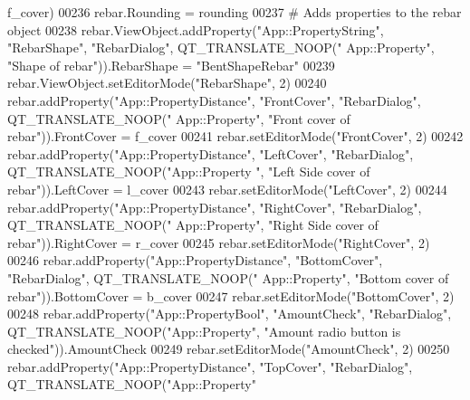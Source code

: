 \begin{DoxyCode}
      f\_cover)
00236     rebar.Rounding = rounding
00237     \textcolor{comment}{# Adds properties to the rebar object}
00238     rebar.ViewObject.addProperty(\textcolor{stringliteral}{"App::PropertyString"}, \textcolor{stringliteral}{"RebarShape"}, \textcolor{stringliteral}{"RebarDialog"}, QT\_TRANSLATE\_NOOP(\textcolor{stringliteral}{"
      App::Property"}, \textcolor{stringliteral}{"Shape of rebar"})).RebarShape = \textcolor{stringliteral}{"BentShapeRebar"}
00239     rebar.ViewObject.setEditorMode(\textcolor{stringliteral}{"RebarShape"}, 2)
00240     rebar.addProperty(\textcolor{stringliteral}{"App::PropertyDistance"}, \textcolor{stringliteral}{"FrontCover"}, \textcolor{stringliteral}{"RebarDialog"}, QT\_TRANSLATE\_NOOP(\textcolor{stringliteral}{"
      App::Property"}, \textcolor{stringliteral}{"Front cover of rebar"})).FrontCover = f\_cover
00241     rebar.setEditorMode(\textcolor{stringliteral}{"FrontCover"}, 2)
00242     rebar.addProperty(\textcolor{stringliteral}{"App::PropertyDistance"}, \textcolor{stringliteral}{"LeftCover"}, \textcolor{stringliteral}{"RebarDialog"}, QT\_TRANSLATE\_NOOP(\textcolor{stringliteral}{"App::Property
      "}, \textcolor{stringliteral}{"Left Side cover of rebar"})).LeftCover = l\_cover
00243     rebar.setEditorMode(\textcolor{stringliteral}{"LeftCover"}, 2)
00244     rebar.addProperty(\textcolor{stringliteral}{"App::PropertyDistance"}, \textcolor{stringliteral}{"RightCover"}, \textcolor{stringliteral}{"RebarDialog"}, QT\_TRANSLATE\_NOOP(\textcolor{stringliteral}{"
      App::Property"}, \textcolor{stringliteral}{"Right Side cover of rebar"})).RightCover = r\_cover
00245     rebar.setEditorMode(\textcolor{stringliteral}{"RightCover"}, 2)
00246     rebar.addProperty(\textcolor{stringliteral}{"App::PropertyDistance"}, \textcolor{stringliteral}{"BottomCover"}, \textcolor{stringliteral}{"RebarDialog"}, QT\_TRANSLATE\_NOOP(\textcolor{stringliteral}{"
      App::Property"}, \textcolor{stringliteral}{"Bottom cover of rebar"})).BottomCover = b\_cover
00247     rebar.setEditorMode(\textcolor{stringliteral}{"BottomCover"}, 2)
00248     rebar.addProperty(\textcolor{stringliteral}{"App::PropertyBool"}, \textcolor{stringliteral}{"AmountCheck"}, \textcolor{stringliteral}{"RebarDialog"}, QT\_TRANSLATE\_NOOP(\textcolor{stringliteral}{"App::Property"},
       \textcolor{stringliteral}{"Amount radio button is checked"})).AmountCheck
00249     rebar.setEditorMode(\textcolor{stringliteral}{"AmountCheck"}, 2)
00250     rebar.addProperty(\textcolor{stringliteral}{"App::PropertyDistance"}, \textcolor{stringliteral}{"TopCover"}, \textcolor{stringliteral}{"RebarDialog"}, QT\_TRANSLATE\_NOOP(\textcolor{stringliteral}{"App::Property"}

\end{DoxyCode}
